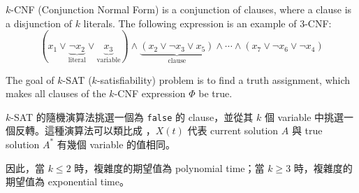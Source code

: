 \begin{example}
$ k $-CNF (Conjunction Normal Form) is a conjunction of clauses, where a clause is a disjunction of $ k $ literals. The following expression is an example of 3-CNF:
\[ (x_{1} \vee \underbrace{\neg x_{2}}_{\text{literal}} \vee \underbrace{x_{3}}_{\text{variable}}) \wedge \underbrace{(x_{2} \vee \neg x_{3} \vee x_{5})}_{\text{clause}} \wedge \cdots \wedge (x_{7} \vee \neg x_{6} \vee \neg x_{4}) \]

The goal of $ k $-SAT ($ k $-satisfiability) problem is to find a truth assignment, which makes all clauses of the $ k $-CNF expression $ \Phi $ be true.

$ k $-SAT 的隨機演算法挑選一個為 {\tt false} 的 clause，並從其 $ k $ 個 variable 中挑選一個反轉。這種演算法可以類比成 ，$ X(t) $ 代表 current solution $ A $ 與 true solution $ A^{*} $ 有幾個 variable 的值相同。

因此，當 $ k \le 2 $ 時，複雜度的期望值為 polynomial time；當 $ k \ge 3 $ 時，複雜度的期望值為 exponential time。
\end{example}
